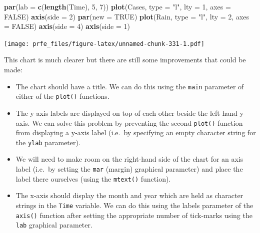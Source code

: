 \documentclass[12pt,]{book}
\newenvironment{Shaded}{\begin{snugshade}}{\end{snugshade}}
\newcommand{\KeywordTok}[1]{\textcolor[rgb]{0.13,0.29,0.53}{\textbf{#1}}}
\newcommand{\DataTypeTok}[1]{\textcolor[rgb]{0.13,0.29,0.53}{#1}}
\newcommand{\DecValTok}[1]{\textcolor[rgb]{0.00,0.00,0.81}{#1}}
\newcommand{\StringTok}[1]{\textcolor[rgb]{0.31,0.60,0.02}{#1}}
\newcommand{\OtherTok}[1]{\textcolor[rgb]{0.56,0.35,0.01}{#1}}
\newcommand{\NormalTok}[1]{#1}
\theoremstyle{definition}
\theoremstyle{definition}
\theoremstyle{definition}
\theoremstyle{remark}
\begin{document}
\begin{Shaded}
\begin{Highlighting}[]
\KeywordTok{par}\NormalTok{(}\DataTypeTok{lab =} \KeywordTok{c}\NormalTok{(}\KeywordTok{length}\NormalTok{(Time), }\DecValTok{5}\NormalTok{, }\DecValTok{7}\NormalTok{))}
\KeywordTok{plot}\NormalTok{(Cases, }\DataTypeTok{type =} \StringTok{"l"}\NormalTok{, }\DataTypeTok{lty =} \DecValTok{1}\NormalTok{, }\DataTypeTok{axes =} \OtherTok{FALSE}\NormalTok{)}
\KeywordTok{axis}\NormalTok{(}\DataTypeTok{side =} \DecValTok{2}\NormalTok{)}
\KeywordTok{par}\NormalTok{(}\DataTypeTok{new =} \OtherTok{TRUE}\NormalTok{)}
\KeywordTok{plot}\NormalTok{(Rain, }\DataTypeTok{type =} \StringTok{"l"}\NormalTok{, }\DataTypeTok{lty =} \DecValTok{2}\NormalTok{, }\DataTypeTok{axes =} \OtherTok{FALSE}\NormalTok{)}
\KeywordTok{axis}\NormalTok{(}\DataTypeTok{side =} \DecValTok{4}\NormalTok{)}
\KeywordTok{axis}\NormalTok{(}\DataTypeTok{side =} \DecValTok{1}\NormalTok{)}
\end{Highlighting}
\end{Shaded}

\texttt{[image: prfe\_files/figure-latex/unnamed-chunk-331-1.pdf]}

This chart is much clearer but there are still some improvements that
could be made:

\begin{itemize}
\item
  The chart should have a title. We can do this using the \texttt{main}
  parameter of either of the \texttt{plot()} functions.
\item
  The y-axis labels are displayed on top of each other beside the
  left-hand y-axis. We can solve this problem by preventing the second
  \texttt{plot()} function from displaying a y-axis label (i.e.~by
  specifying an empty character string for the \texttt{ylab} parameter).
\item
  We will need to make room on the right-hand side of the chart for an
  axis label (i.e.~by setting the \texttt{mar} (margin) graphical
  parameter) and place the label there ourselves (using the
  \texttt{mtext()} function).
\item
  The x-axis should display the month and year which are held as
  character strings in the \texttt{Time} variable. We can do this using
  the labels parameter of the \texttt{axis()} function after setting the
  appropriate number of tick-marks using the \texttt{lab} graphical
  parameter.
\end{itemize}
\end{document}
